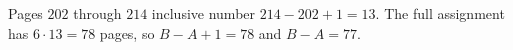 Pages $202$ through $214$ inclusive number $214-202+1=13$. The full assignment has $6\cdot13=78$ pages, so $B-A+1=78$ and $\boxed{B-A=77}$.
